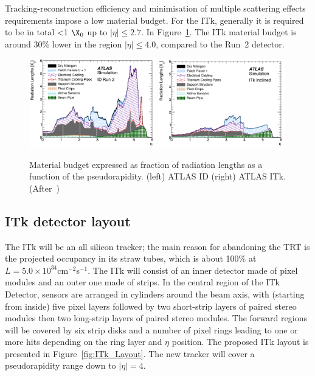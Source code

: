  
 Tracking-reconstruction efficiency and minimisation of multiple scattering effects requirements impose a 
 low material budget. For the ITk, generally it is required to be in total <1 $\X_0$ up to $|\eta|\le2.7$.
 In Figure~\ref{fig:ITk_X0}.
  The ITk material budget is around 30\% lower in the region $|\eta|\le4.0$, compared to the Run~2 detector.
\begin{figure}[!htpb]
\centering
\includegraphics[width=0.49\textwidth]{ID_X0.png}
\includegraphics[width=0.49\textwidth]{ITk_X0.png}
\caption{\label{fig:ITk_X0}Material budget expressed as fraction of radiation lengths as a function of the 
pseudorapidity. (left) ATLAS ID (right) ATLAS ITk. (After~\cite{ITkStripsTDR})}
\end{figure}
  
\subsection{ITk detector layout}

The ITk will be an all silicon tracker; the main reason for abandoning the TRT is the projected occupancy 
in its straw tubes, which is about 100\% at $L=5.0\times10^{34}$cm$^{-2}$s$^{-1}$. 
The ITk will consist of an inner detector made of pixel modules and an outer one made of strips. 
In the central region of the ITk Detector, sensors are arranged in cylinders around the beam axis, with (starting from inside) five pixel layers followed by two short-strip layers of paired stereo modules then two long-strip layers of paired stereo modules. The forward regions will be covered by six strip disks and a number of pixel rings leading to one or more hits depending on the ring layer and $\eta$ position. 
The proposed ITk layout is presented in Figure~\ref{fig:ITk_Layout}. The new tracker will cover a pseudorapidity range down to $|\eta|=4$. 

